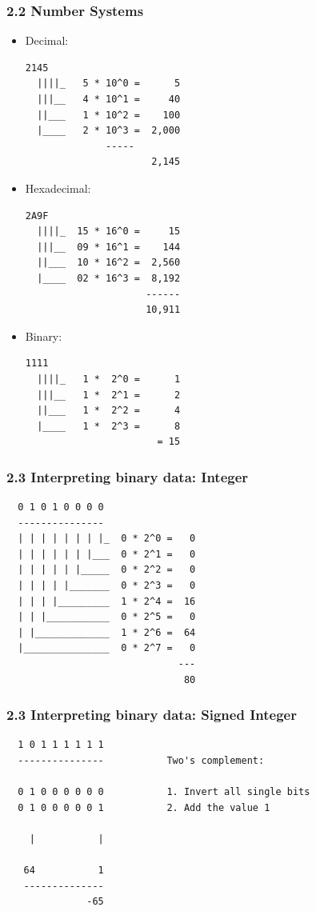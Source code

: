 \begin{frame}[fragile]
  \frametitle{2.2 Number Systems}
    \begin{itemize}
        \item Decimal:
  \begin{lstlisting}[basicstyle=\tiny]
  2145
  ||||_   5 * 10^0 =      5
  |||__   4 * 10^1 =     40
  ||___   1 * 10^2 =    100
  |____   2 * 10^3 =  2,000
		      -----
                      2,145
  \end{lstlisting}
        \item Hexadecimal:
  \begin{lstlisting}[basicstyle=\tiny]
  2A9F
  ||||_  15 * 16^0 =     15
  |||__  09 * 16^1 =    144
  ||___  10 * 16^2 =  2,560
  |____  02 * 16^3 =  8,192
                     ------
                     10,911
  \end{lstlisting}
        \item Binary:
  \begin{lstlisting}[basicstyle=\tiny]
  1111
  ||||_   1 *  2^0 =      1
  |||__   1 *  2^1 =      2
  ||___   1 *  2^2 =      4
  |____   1 *  2^3 =      8
                       = 15
  \end{lstlisting}
    \end{itemize}
\end{frame}


\begin{frame}[fragile]
  \frametitle{2.3 Interpreting binary data: Integer}
  \begin{verbatim}
  0 1 0 1 0 0 0 0
  ---------------
  | | | | | | | |_  0 * 2^0 =   0
  | | | | | | |___  0 * 2^1 =   0
  | | | | | |_____  0 * 2^2 =   0
  | | | | |_______  0 * 2^3 =   0
  | | | |_________  1 * 2^4 =  16
  | | |___________  0 * 2^5 =   0
  | |_____________  1 * 2^6 =  64
  |_______________  0 * 2^7 =   0
                              ---
                               80
  \end{verbatim}
\end{frame}


\begin{frame}[fragile]
  \frametitle{2.3 Interpreting binary data: Signed Integer}
  \begin{verbatim}
  1 0 1 1 1 1 1 1
  ---------------           Two's complement:

  0 1 0 0 0 0 0 0           1. Invert all single bits
  0 1 0 0 0 0 0 1           2. Add the value 1

    |           |

   64           1
   --------------
              -65
  \end{verbatim}
\end{frame}


